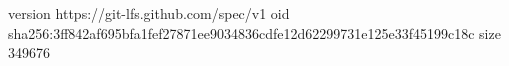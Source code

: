 version https://git-lfs.github.com/spec/v1
oid sha256:3ff842af695bfa1fef27871ee9034836cdfe12d62299731e125e33f45199c18c
size 349676
